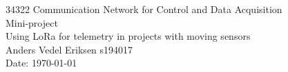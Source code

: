 \documentclass{article}
\begin{document}
\begin{minipage}{\textwidth}
  \Large
  \centering
  {\large 34322 Communication Network for Control and Data Acquisition\\}
  Mini-project\\
  Using LoRa for telemetry in projects with moving sensors\\
  Anders Vedel Eriksen s194017\\
  Date: \today
  \vspace{1cm}
\end{minipage}



\newpage
\printbibliography
\end{document}
